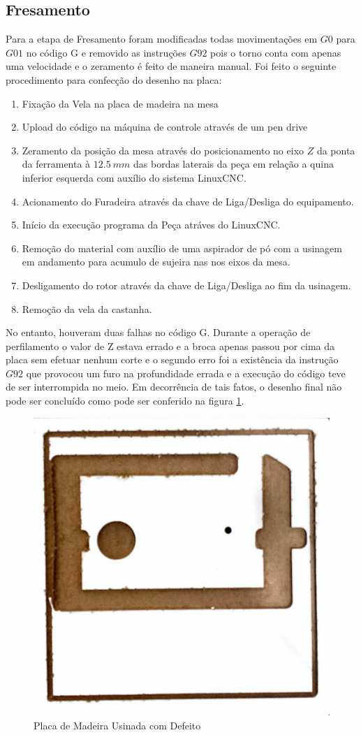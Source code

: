 \documentclass[a4paper,11pt]{article}
\begin{document}
\subsection{Fresamento}
Para a etapa de Fresamento foram modificadas todas movimentações em $G0$ para $G01$ no código G e removido as instruções $G92$ pois o torno conta com apenas uma velocidade e o zeramento é feito de maneira manual. Foi feito o seguinte procedimento para confecção do desenho na placa:
\begin{enumerate}
    \item Fixação da Vela na placa de madeira na mesa
    \item Upload do código na máquina de controle através de um pen drive
    \item Zeramento da posição da mesa através do posicionamento no eixo $Z$ da ponta da ferramenta à $12.5\ mm$ das bordas laterais da peça em relação a quina inferior esquerda com auxílio do sistema LinuxCNC.
    \item Acionamento do Furadeira através da chave de Liga/Desliga do equipamento.
    \item Início da execução programa da Peça atráves do LinuxCNC.
    \item Remoção do material com auxílio de uma aspirador de pó com a usinagem em andamento para acumulo de sujeira nas nos eixos da mesa.
    \item Desligamento do rotor através da chave de Liga/Desliga ao fim da usinagem.
    \item Remoção da vela da castanha.
\end{enumerate}

No entanto, houveram duas falhas no código G. Durante a operação de perfilamento o valor de Z estava errado e a broca apenas passou por cima da placa sem efetuar nenhum corte e o segundo erro foi a existência da instrução $G92$ que provocou um furo na profundidade errada e a execução do código teve de ser interrompida no meio. Em decorrência de tais fatos, o desenho final não pode ser concluído como pode ser conferido na figura \ref{fig:placa-final}.

\begin{figure}[H]
    \centering
    \includegraphics[width = 0.6\linewidth]{img/relat2/placaUsinada}
    \caption{Placa de Madeira Usinada com Defeito}
    \label{fig:placa-final}
\end{figure}
\end{document}
